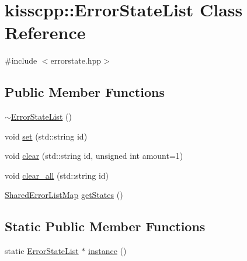 \hypertarget{classkisscpp_1_1_error_state_list}{\section{kisscpp\-:\-:Error\-State\-List Class Reference}
\label{classkisscpp_1_1_error_state_list}
}


{\ttfamily \#include $<$errorstate.\-hpp$>$}

\subsection*{Public Member Functions}
\begin{DoxyCompactItemize}
\item 
\hyperlink{classkisscpp_1_1_error_state_list_a0c53a01c63906189fad454dd5e217181}{$\sim$\-Error\-State\-List} ()
\item 
void \hyperlink{classkisscpp_1_1_error_state_list_a0f5ea6e5363e8760ee51f0c6758ce1f2}{set} (std\-::string id)
\item 
void \hyperlink{classkisscpp_1_1_error_state_list_a7554ade79ea41514ff1ab2fbc68e8f1e}{clear} (std\-::string id, unsigned int amount=1)
\item 
void \hyperlink{classkisscpp_1_1_error_state_list_a722756f4074d2ec25fc5520320249133}{clear\-\_\-all} (std\-::string id)
\item 
\hyperlink{namespacekisscpp_a52b7a11959a119c1da931042d7751db0}{Shared\-Error\-List\-Map} \hyperlink{classkisscpp_1_1_error_state_list_af51ba7384104a15f7809f62da9c5447d}{get\-States} ()
\end{DoxyCompactItemize}
\subsection*{Static Public Member Functions}
\begin{DoxyCompactItemize}
\item 
static \hyperlink{classkisscpp_1_1_error_state_list}{Error\-State\-List} $\ast$ \hyperlink{classkisscpp_1_1_error_state_list_a20309374dc63ffee8aebeb986340dfba}{instance} ()
\end{DoxyCompactItemize}


